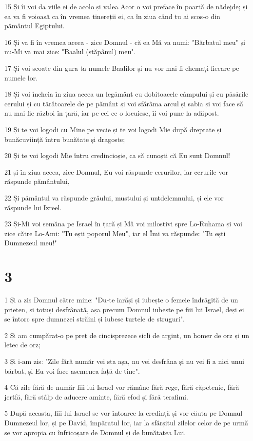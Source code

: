 \par 15 Și îi voi da viile ei de acolo și valea Acor o voi preface în poartă de nădejde; și ea va fi voioasă ca în vremea tinereții ei, ca în ziua când tu ai scos-o din pământul Egiptului.
\par 16 Și va fi în vremea aceea - zice Domnul - că ea Mă va numi: "Bărbatul meu" și nu-Mi va mai zice: "Baalul (stăpânul) meu".
\par 17 Și voi scoate din gura ta numele Baalilor și nu vor mai fi chemați fiecare pe numele lor.
\par 18 Și voi încheia în ziua aceea un legământ cu dobitoacele câmpului și cu păsările cerului și cu târâtoarele de pe pământ și voi sfărâma arcul și sabia și voi face să nu mai fie război în țară, iar pe cei ce o locuiesc, îi voi pune la adăpost.
\par 19 Și te voi logodi cu Mine pe vecie și te voi logodi Mie după dreptate și bunăcuviință întru bunătate și dragoste;
\par 20 Și te voi logodi Mie întru credincioșie, ca să cunoști că Eu sunt Domnul!
\par 21 și în ziua aceea, zice Domnul, Eu voi răspunde cerurilor, iar cerurile vor răspunde pământului,
\par 22 Și pământul va răspunde grâului, mustului și untdelemnului, și ele vor răspunde lui Izreel.
\par 23 Și-Mi voi semăna pe Israel în țară și Mă voi milostivi spre Lo-Ruhama și voi zice către Lo-Ami: "Tu ești poporul Meu", iar el Îmi va răspunde: "Tu ești Dumnezeul meu!"

\chapter{3}

\par 1 Și a zis Domnul către mine: "Du-te iarăși și iubește o femeie îndrăgită de un prieten, și totuși desfrânată, așa precum Domnul iubește pe fiii lui Israel, deși ei se întorc spre dumnezei străini și iubesc turtele de struguri".
\par 2 Și am cumpărat-o pe preț de cincisprezece sicli de argint, un homer de orz și un letec de orz;
\par 3 Și i-am zis: "Zile fără număr vei sta așa, nu vei desfrâna și nu vei fi a nici unui bărbat, și Eu voi face asemenea față de tine".
\par 4 Că zile fără de număr fiii lui Israel vor rămâne fără rege, fără căpetenie, fără jertfă, fără stâlp de aducere aminte, fără efod și fără terafimi.
\par 5 După aceasta, fiii lui Israel se vor întoarce la credință și vor căuta pe Domnul Dumnezeul lor, și pe David, împăratul lor, iar la sfârșitul zilelor celor de pe urmă se vor apropia cu înfricoșare de Domnul și de bunătatea Lui.

